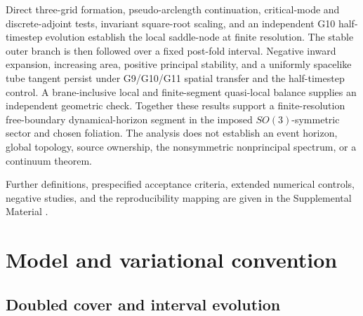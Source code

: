 \documentclass[11pt]{article}
\begin{document}
Direct three-grid formation, pseudo-arclength continuation, critical-mode and
discrete-adjoint tests, invariant square-root scaling, and an independent G10
half-timestep evolution establish the local saddle-node at finite resolution.
The stable outer branch is then followed over a fixed post-fold interval.
Negative inward expansion, increasing area, positive principal stability, and
a uniformly spacelike tube tangent persist under G9/G10/G11 spatial transfer
and the half-timestep control.  A brane-inclusive local and finite-segment
quasi-local balance supplies an independent geometric check.  Together these
results support a finite-resolution free-boundary dynamical-horizon segment in
the imposed $SO(3)$-symmetric sector and chosen foliation.  The analysis does
not establish an event horizon, global topology, source ownership, the
nonsymmetric nonprincipal spectrum, or a continuum theorem.

Further definitions, prespecified acceptance criteria, extended numerical
controls, negative studies, and the reproducibility mapping are given in the
Supplemental Material \cite{SupplementalMaterial}.

\section{Model and variational convention}

\subsection{Doubled cover and interval evolution}
\end{document}
